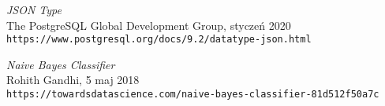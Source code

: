 \begin{thebibliography}{20}
\textit{JSON Type}
\\The PostgreSQL Global Development Group, styczeń 2020
\\\texttt{https://www.postgresql.org/docs/9.2/datatype-json.html}

\textit{Naive Bayes Classifier}
\\Rohith Gandhi, 5 maj 2018
\\\texttt{https://towardsdatascience.com/naive-bayes-classifier-81d512f50a7c}










\end{thebibliography}